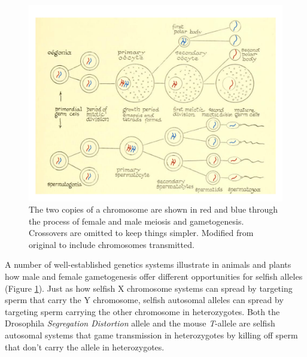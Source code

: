 {  \begin{figure}
\begin{center}
\includegraphics[width= \textwidth]{illustration_images/single_locus_selection/gametogenesis_male_female/gametogenesis_w_chr.pdf}
\end{center}
\caption{
   The two copies of a chromosome are shown in red and blue through
   the process of female and male meiosis and gametogenesis.  Crossovers are omitted to keep things simpler. 
Modified from original to include chromosomes transmitted.
   } \label{fig:gametogenesis_male_female}
\end{figure}  %


A number of well-established genetics systems illustrate in
animals and plants how male and female gametogenesis offer different
opportunities for selfish alleles (Figure \ref{fig:gametogenesis_male_female}). Just as how selfish X chromosome systems can spread by
targeting sperm that carry the Y chromosome, selfish autosomal alleles
can spread by targeting sperm carrying the other chromosome in
heterozygotes. Both the Drosophila {\it Segregation Distortion} allele and
the mouse {\it T}-allele are selfish autosomal systems that
game transmission in heterozygotes by killing off sperm that don't carry the allele in heterozygotes.


}

